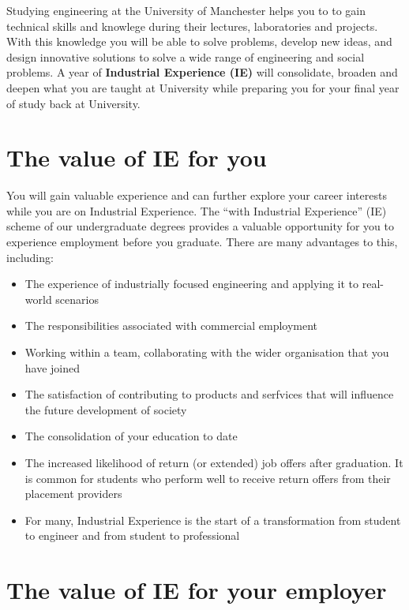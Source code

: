 \documentclass[
]{book}
\providecommand{\tightlist}{%
  \setlength{\itemsep}{0pt}\setlength{\parskip}{0pt}}
\begin{document}
Studying engineering at the University of Manchester helps you to to gain technical skills and knowlege during their lectures, laboratories and projects. With this knowledge you will be able to solve problems, develop new ideas, and design innovative solutions to solve a wide range of engineering and social problems. A year of \textbf{Industrial Experience (IE)} will consolidate, broaden and deepen what you are taught at University while preparing you for your final year of study back at University.

\section{The value of IE for you}\label{value}

You will gain valuable experience and can further explore your career interests while you are on Industrial Experience. \citep{ucas} The ``with Industrial Experience'' (IE) scheme of our undergraduate degrees provides a valuable opportunity for you to experience employment before you graduate. There are many advantages to this, including:

\begin{itemize}
\tightlist
\item
  The experience of industrially focused engineering and applying it to real-world scenarios
\item
  The responsibilities associated with commercial employment
\item
  Working within a team, collaborating with the wider organisation that you have joined
\item
  The satisfaction of contributing to products and serfvices that will influence the future development of society
\item
  The consolidation of your education to date
\item
  The increased likelihood of return (or extended) job offers after graduation. It is common for students who perform well to receive return offers from their placement providers
\item
  For many, Industrial Experience is the start of a transformation from student to engineer and from student to professional
\end{itemize}

\section{The value of IE for your employer}\label{evalue}
\end{document}
